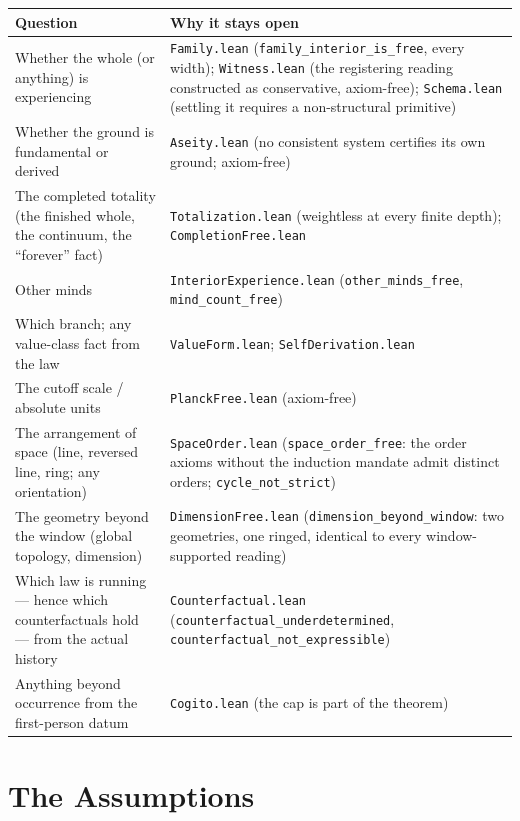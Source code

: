 \documentclass[11pt]{article}
\theoremstyle{remark}
\newcommand{\lf}[1]{\texttt{#1}}       %
\begin{document}
\begin{center}
\small
\begin{tabular}{@{}p{}p{}@{}}
\toprule
\textbf{Question} & \textbf{Why it stays open} \\
\midrule
Whether the whole (or anything) is experiencing & \lf{Family.lean} (\lf{family\_interior\_is\_free}, every width); \lf{Witness.lean} (the registering reading constructed as conservative, axiom-free); \lf{Schema.lean} (settling it requires a non-structural primitive) \\
\addlinespace[2pt]
Whether the ground is fundamental or derived & \lf{Aseity.lean} (no consistent system certifies its own ground; axiom-free) \\
\addlinespace[2pt]
The completed totality (the finished whole, the continuum, the ``forever'' fact) & \lf{Totalization.lean} (weightless at every finite depth); \lf{CompletionFree.lean} \\
\addlinespace[2pt]
Other minds & \lf{InteriorExperience.lean} (\lf{other\_minds\_free}, \lf{mind\_count\_free}) \\
\addlinespace[2pt]
Which branch; any value-class fact from the law & \lf{ValueForm.lean}; \lf{SelfDerivation.lean} \\
\addlinespace[2pt]
The cutoff scale / absolute units & \lf{PlanckFree.lean} (axiom-free) \\
\addlinespace[2pt]
The arrangement of space (line, reversed line, ring; any orientation) & \lf{SpaceOrder.lean} (\lf{space\_order\_free}: the order axioms without the induction mandate admit distinct orders; \lf{cycle\_not\_strict}) \\
\addlinespace[2pt]
The geometry beyond the window (global topology, dimension) & \lf{DimensionFree.lean} (\lf{dimension\_beyond\_window}: two geometries, one ringed, identical to every window-supported reading) \\
\addlinespace[2pt]
Which law is running --- hence which counterfactuals hold --- from the actual history & \lf{Counterfactual.lean} (\lf{counterfactual\_underdetermined}, \lf{counterfactual\_not\_expressible}) \\
\addlinespace[2pt]
Anything beyond occurrence from the first-person datum & \lf{Cogito.lean} (the cap is part of the theorem) \\
\bottomrule
\end{tabular}
\end{center}

\section{The Assumptions}\label{sec:premises}
\end{document}
